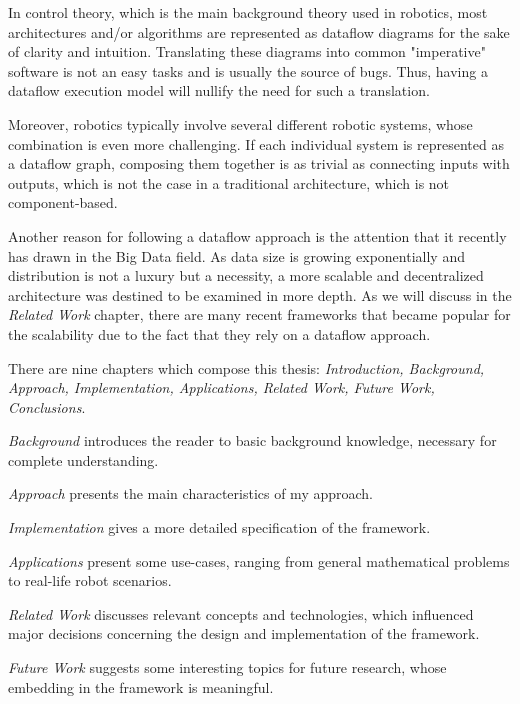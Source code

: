 \documentclass{dithesis}
\begin{document}

In control theory, which is the main background theory used in robotics, most architectures and/or algorithms are represented as dataflow diagrams for the sake of clarity and intuition. Translating these diagrams into common "imperative" software is not an easy tasks and is usually the source of bugs. Thus, having a dataflow execution model will nullify the need for such a translation.

Moreover, robotics typically involve several different robotic systems, whose combination is even more challenging. If each individual system is represented as a dataflow graph, composing them together is as trivial as connecting inputs with outputs, which is not the case in a traditional architecture, which is not component-based.


Another reason for following a dataflow approach is the attention that it recently has drawn in the Big Data field. As data size is growing exponentially and distribution is not a luxury but a necessity, a more scalable and decentralized architecture was destined to be examined in more depth. As we will discuss in the \textit{Related Work} chapter, there are many recent frameworks that became popular for the scalability due to the fact that they rely on a dataflow approach.


There are nine chapters which compose this thesis: \textit{Introduction, Background, Approach, Implementation, Applications, Related Work, Future Work, Conclusions}.

\textit{Background} introduces the reader to basic background knowledge, necessary for complete understanding.

\textit{Approach} presents the main characteristics of my approach.

\textit{Implementation} gives a more detailed specification of the framework.

\textit{Applications} present some use-cases, ranging from general mathematical problems to real-life robot scenarios.

\textit{Related Work} discusses relevant concepts and technologies, which influenced major decisions concerning the design and implementation of the framework.

\textit{Future Work} suggests some interesting topics for future research, whose embedding in the framework is meaningful.
\end{document}
